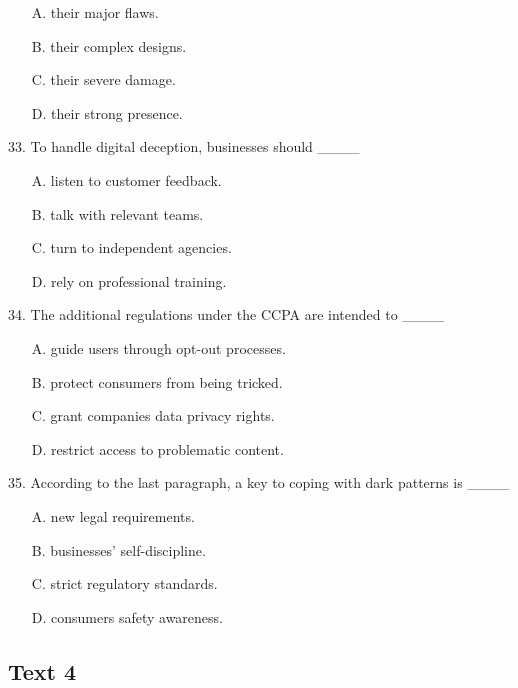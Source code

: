 \documentclass[UTF8,11pt]{ctexart}
\begin{document}
\begin{itemize}[leftmargin=2em,itemsep=.2em,topsep=.4em]\item[A.] their major flaws.
\item[B.] their complex designs.
\item[C.] their severe damage.
\item[D.] their strong presence.
\end{itemize}

33. To handle digital deception, businesses should \_\_\_\_


\begin{itemize}[leftmargin=2em,itemsep=.2em,topsep=.4em]\item[A.] listen to customer feedback.
\item[B.] talk with relevant teams.
\item[C.] turn to independent agencies.
\item[D.] rely on professional training.
\end{itemize}

34. The additional regulations under the CCPA are intended to \_\_\_\_


\begin{itemize}[leftmargin=2em,itemsep=.2em,topsep=.4em]\item[A.] guide users through opt-out processes.
\item[B.] protect consumers from being tricked.
\item[C.] grant companies data privacy rights.
\item[D.] restrict access to problematic content.
\end{itemize}

35. According to the last paragraph, a key to coping with dark patterns is \_\_\_\_


\begin{itemize}[leftmargin=2em,itemsep=.2em,topsep=.4em]\item[A.] new legal requirements.
\item[B.] businesses’ self-discipline.
\item[C.] strict regulatory standards.
\item[D.] consumers safety awareness.
\end{itemize}

\subsection*{\textbf{Text 4}}
\end{document}
